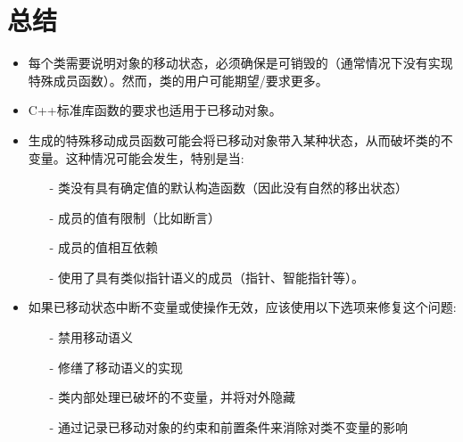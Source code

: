 \section{总结}
\begin{itemize}
	\item 每个类需要说明对象的移动状态，必须确保是可销毁的（通常情况下没有实现特殊成员函数）。然而，类的用户可能期望/要求更多。
	\item C++标准库函数的要求也适用于已移动对象。
	\item 生成的特殊移动成员函数可能会将已移动对象带入某种状态，从而破坏类的不变量。这种情况可能会发生，特别是当:
	\begin{itemize}
		\item[-] 类没有具有确定值的默认构造函数（因此没有自然的移出状态）
		\item[-] 成员的值有限制（比如断言）
		\item[-] 成员的值相互依赖
		\item[-] 使用了具有类似指针语义的成员（指针、智能指针等）。
	\end{itemize}
	\item 如果已移动状态中断不变量或使操作无效，应该使用以下选项来修复这个问题:
	\begin{itemize}
		\item[-] 禁用移动语义
		\item[-] 修缮了移动语义的实现
		\item[-] 类内部处理已破坏的不变量，并将对外隐藏
		\item[-] 通过记录已移动对象的约束和前置条件来消除对类不变量的影响
	\end{itemize}
\end{itemize}


